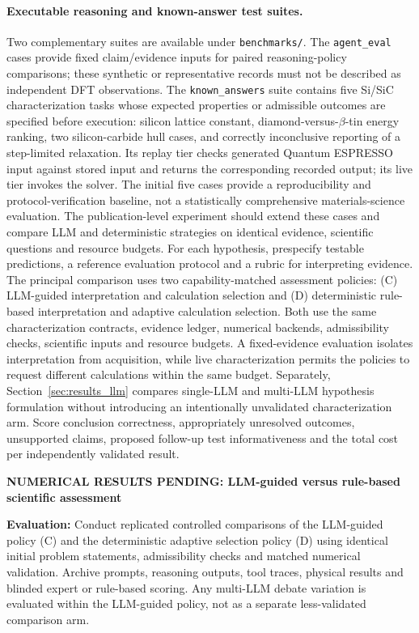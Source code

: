 \documentclass[11pt,a4paper]{article}
\newcommand{\newexperiment}[2]{\par\medskip\noindent\begingroup\color{red!80!black}\textbf{NUMERICAL RESULTS PENDING: #1}\par\noindent\textbf{Evaluation:} #2\par\endgroup\medskip}
\begin{document}
\paragraph{Executable reasoning and known-answer test suites.}
Two complementary suites are available under \texttt{benchmarks/}. The \texttt{agent\_eval} cases provide fixed claim/evidence inputs for paired reasoning-policy comparisons; these synthetic or representative records must not be described as independent DFT observations. The \texttt{known\_answers} suite contains five Si/SiC characterization tasks whose expected properties or admissible outcomes are specified before execution: silicon lattice constant, diamond-versus-$\beta$-tin energy ranking, two silicon-carbide hull cases, and correctly inconclusive reporting of a step-limited relaxation. Its replay tier checks generated Quantum ESPRESSO input against stored input and returns the corresponding recorded output; its live tier invokes the solver. The initial five cases provide a reproducibility and protocol-verification baseline, not a statistically comprehensive materials-science evaluation. The publication-level experiment should extend these cases and compare LLM and deterministic strategies on identical evidence, scientific questions and resource budgets.
For each hypothesis, prespecify testable predictions, a reference evaluation protocol and a rubric for interpreting evidence. The principal comparison uses two capability-matched assessment policies: (C) LLM-guided interpretation and calculation selection and (D) deterministic rule-based interpretation and adaptive calculation selection. Both use the same characterization contracts, evidence ledger, numerical backends, admissibility checks, scientific inputs and resource budgets. A fixed-evidence evaluation isolates interpretation from acquisition, while live characterization permits the policies to request different calculations within the same budget. Separately, Section~\ref{sec:results_llm} compares single-LLM and multi-LLM hypothesis formulation without introducing an intentionally unvalidated characterization arm. Score conclusion correctness, appropriately unresolved outcomes, unsupported claims, proposed follow-up test informativeness and the total cost per independently validated result.
\newexperiment{LLM-guided versus rule-based scientific assessment}{Conduct replicated controlled comparisons of the LLM-guided policy (C) and the deterministic adaptive selection policy (D) using identical initial problem statements, admissibility checks and matched numerical validation. Archive prompts, reasoning outputs, tool traces, physical results and blinded expert or rule-based scoring. Any multi-LLM debate variation is evaluated within the LLM-guided policy, not as a separate less-validated comparison arm.}
\end{document}
